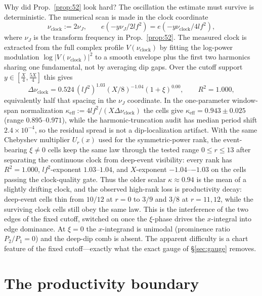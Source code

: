 \documentclass[11pt]{article}
\theoremstyle{definition}
\begin{document}
Why did Prop.~\ref{prop:52} look hard? The oscillation the estimate must survive is deterministic.
The numerical scan is made in the clock coordinate
\[
  \nu_{\mathrm{clock}}:=2\nu_J,\qquad
  e(-y\nu_J/2lf^2)=e(-y\nu_{\mathrm{clock}}/4lf^2),
\]
where $\nu_J$ is the transform frequency in Prop.~\ref{prop:52}. The measured clock is extracted from the
full complex profile $V(\nu_{\mathrm{clock}})$ by fitting the log-power modulation
$\log |V(\nu_{\mathrm{clock}})|^2$ to a smooth envelope plus the first two harmonics sharing one
fundamental, not by averaging dip gaps. Over the cutoff support $y\in[\tfrac X4,\tfrac{5X}4]$ this gives
\[
  \Delta\nu_{\mathrm{clock}}
   =0.524\,(lf^2)^{1.03}(X/8)^{-1.04}(1+\xi)^{0.00},\qquad R^2=1.000,
\]
equivalently half that spacing in the $\nu_J$ coordinate. In the one-parameter window-span normalization
$\kappa_{\mathrm{eff}}:=4lf^2/(X\Delta\nu_{\mathrm{clock}})$ the cells give
$\kappa_{\mathrm{eff}}=0.943\pm0.025$ (range $0.895$--$0.971$), while the harmonic-truncation audit has
median period shift $2.4\times10^{-4}$, so the residual spread is not a dip-localization artifact. With the
same Chebyshev multiplier $U_r(x)$ used for the symmetric-power rank, the event-bearing $\xi\ne0$ cells keep
the same law through the tested range $0\le r\le13$ after separating the continuous clock from deep-event
visibility: every rank has $R^2=1.000$, $lf^2$-exponent $1.03$--$1.04$, and $X$-exponent
$-1.04$--$-1.03$ on the cells passing the clock-quality gate. Thus the older scalar
$\kappa\approx0.94$ is the mean of a slightly drifting clock, and the observed high-rank loss is productivity
decay: deep-event cells thin from $10/12$ at $r=0$ to $3/9$ and $3/8$ at $r=11,12$, while the surviving
clock cells still obey the same law. This is
the interference of the two edges of the fixed cutoff, switched on once the $\xi$-phase drives the $x$-integral
into edge dominance. At $\xi=0$ the $x$-integrand is unimodal (prominence ratio $P_2/P_1=0$) and the deep-dip
comb is absent. The apparent difficulty is a chart feature of
the fixed cutoff---exactly what the exact gauge of \S\ref{sec:gauge} removes.

\section{The productivity boundary}\label{sec:sarnak}
\end{document}
